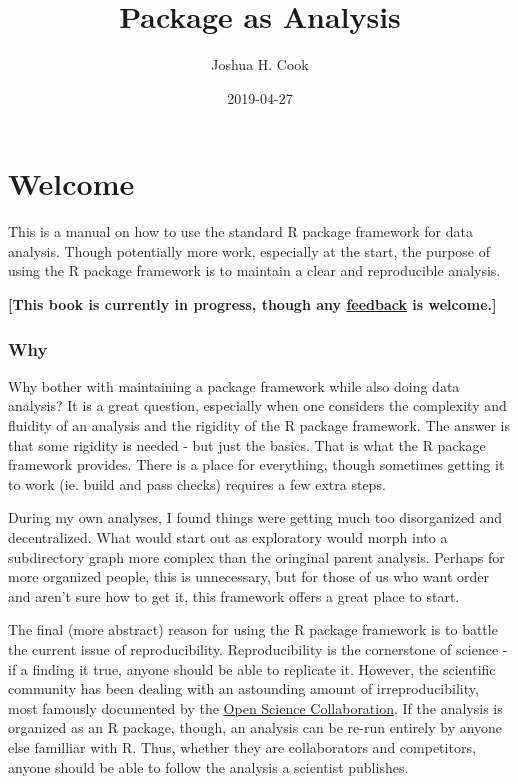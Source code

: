\documentclass[]{book}
\title{Package as Analysis}
\author{Joshua H. Cook}
\date{2019-04-27}
\begin{document}
\maketitle

{
\setcounter{tocdepth}{1}
\tableofcontents
}
\hypertarget{welcome}{%
\chapter*{Welcome}\label{welcome}}

This is a manual on how to use the standard R package framework for data analysis. Though potentially more work, especially at the start, the purpose of using the R package framework is to maintain a clear and reproducible analysis.

\textbf{{[}This book is currently in progress, though any \href{https://github.com/jhrcook/package-as-analysis/issues}{feedback} is welcome.{]}}

\hypertarget{why}{%
\subsection*{Why}\label{why}}

Why bother with maintaining a package framework while also doing data analysis? It is a great question, especially when one considers the complexity and fluidity of an analysis and the rigidity of the R package framework. The answer is that some rigidity is needed - but just the basics. That is what the R package framework provides. There is a place for everything, though sometimes getting it to work (ie. build and pass checks) requires a few extra steps.

During my own analyses, I found things were getting much too disorganized and decentralized. What would start out as exploratory would morph into a subdirectory graph more complex than the oringinal parent analysis. Perhaps for more organized people, this is unnecessary, but for those of us who want order and aren't sure how to get it, this framework offers a great place to start.

The final (more abstract) reason for using the R package framework is to battle the current issue of reproducibility. Reproducibility is the cornerstone of science - if a finding it true, anyone should be able to replicate it. However, the scientific community has been dealing with an astounding amount of irreproducibility, most famously documented by the \href{http://science.sciencemag.org/content/349/6251/aac4716}{Open Science Collaboration}. If the analysis is organized as an R package, though, an analysis can be re-run entirely by anyone else familliar with R. Thus, whether they are collaborators and competitors, anyone should be able to follow the analysis a scientist publishes.
\end{document}
